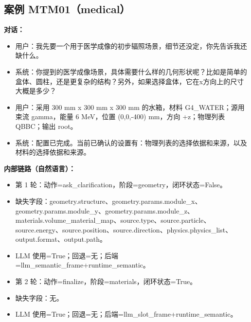 \documentclass[11pt]{ctexart}
\begin{document}
\subsection{案例 MTM01（medical）}
\textbf{对话：}
\begin{itemize}
\item 用户：我先要一个用于医学成像的初步辐照场景，细节还没定，你先告诉我还缺什么。
\item 系统：你提到的医学成像场景，具体需要什么样的几何形状呢？比如是简单的盒体、圆柱，还是更复杂的结构？另外，如果选择盒体，它在x方向上的尺寸大概是多少？
\item 用户：采用 300 mm x 300 mm x 300 mm 的水箱，材料 G4\_WATER；源用束流 gamma，能量 6 MeV，位置 (0,0,-400) mm，方向 +z；物理列表 QBBC；输出 root。
\item 系统：配置已完成。当前已确认的设置有：物理列表的选择依据和来源，以及材料的选择依据和来源。
\end{itemize}
\textbf{内部链路（自然语言）：}
\begin{itemize}
\item 第 1 轮：动作=ask\_clarification，阶段=geometry，闭环状态=False。
\item 缺失字段：geometry.structure、geometry.params.module\_x、geometry.params.module\_y、geometry.params.module\_z、materials.volume\_material\_map、source.type、source.particle、source.energy、source.position、source.direction、physics.physics\_list、output.format、output.path。
\item LLM 使用=True；回退=无；后端=llm\_semantic\_frame+runtime\_semantic。
\item 第 2 轮：动作=finalize，阶段=materials，闭环状态=True。
\item 缺失字段：无。
\item LLM 使用=True；回退=无；后端=llm\_slot\_frame+runtime\_semantic。
\end{itemize}
\end{document}
